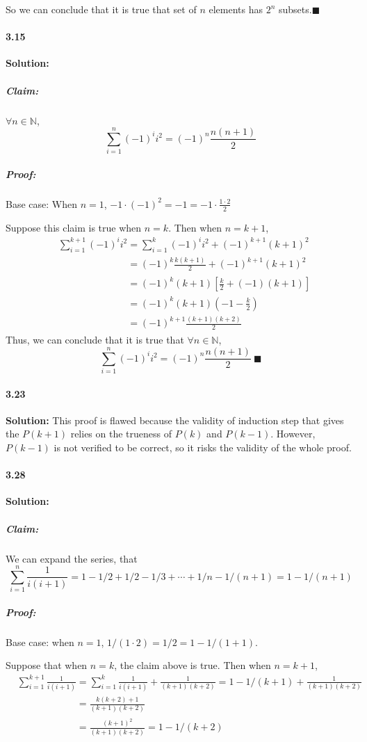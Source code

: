 \documentclass{article}[11pt]
\begin{document}
			So we can conclude that it is true that set of $n$ elements has $2^n$ subsets.$\blacksquare$

	\paragraph{3.15}\textbf{Solution:}
		\subparagraph{Claim:} $\forall n \in \mathbb{N}$, \[\sum_{i = 1}^n (-1)^ii^2 = (-1)^n \frac{n(n+1)}{2}\]
		\subparagraph{Proof:} Base case: When $n = 1$, $-1 \cdot (-1)^2 = -1 = -1		\cdot \frac{1\cdot 2}{2}$
		
		Suppose this claim is true when $n = k$. Then when $n = k + 1$, 
		\begin{align}
			&\sum_{i = 1}^{k + 1} (-1)^ii^2 = \sum_{i = 1}^{k} (-1)^ii^2 + (-1)^{k+1}(k+1)^2\nonumber\\
			&\phantom{\sum_{i = 1}^{k + 1} (-1)^ii^2} = (-1)^k \frac{k(k+1)}{2} + (-1)^{k+1}(k+1)^2\nonumber\\
			&\phantom{\sum_{i = 1}^{k + 1} (-1)^ii^2} = (-1)^k(k+1)[\frac{k}{2} + (-1)(k+1)]\nonumber\\
			&\phantom{\sum_{i = 1}^{k + 1} (-1)^ii^2} = (-1)^k(k+1)(-1 - \frac{k}{2})\nonumber\\
			&\phantom{\sum_{i = 1}^{k + 1} (-1)^ii^2} = (-1)^{k+1}\frac{(k+1)(k+2)}{2}\nonumber
		\end{align}
		Thus, we can conclude that it is true that $\forall n \in \mathbb{N}$, \[\sum_{i = 1}^n (-1)^ii^2 = (-1)^n \frac{n(n+1)}{2}\ \blacksquare\]
	\paragraph{3.23}\textbf{Solution:} This proof is flawed because the validity of induction step that gives the $P(k + 1)$ relies on the trueness of $P(k)$ and $P(k - 1)$. However, $P(k - 1)$ is not verified to be correct, so it risks the validity of the whole proof.
	\paragraph{3.28}\textbf{Solution:}
		\subparagraph{Claim:} We can expand the series, that \[\sum_{i = 1}^n \frac{1}{i(i+1)} = 1 - 1/2 + 1/2 - 1/3 + \cdots + 1/n - 1/(n+1) = 1 - 1/(n + 1)\]
		\subparagraph{Proof:} Base case: when $n = 1$, $1/(1\cdot 2) = 1/2 = 1 - 1/(1+1)$.
		
		Suppose that when $n = k$, the claim above is true. Then when $n = k + 1$, 
		\begin{align}
		&\sum_{i = 1}^{k + 1} \frac{1}{i(i+1)} = \sum_{i = 1}^k \frac{1}{i(i+1)} + \frac{1}{(k+1)(k+2)} = 1 - 1/(k+1) + \frac{1}{(k+1)(k+2)}\nonumber\\
		&\phantom{\sum_{i = 1}^{k + 1} \frac{1}{i(i+1)}} = 
		\frac{k(k+2) + 1}{(k + 1)(k + 2)}\nonumber\\
		&\phantom{\sum_{i = 1}^{k + 1} \frac{1}{i(i+1)}} = \frac{(k+1)^2}{(k+1)(k+2)} = 1 - 1/(k+2)\nonumber
		\end{align}
		
\end{document}
